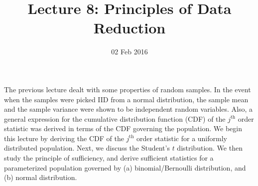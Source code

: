 \documentclass[a4paper,english,12pt]{article}
\title{Lecture 8: Principles of Data Reduction}
\date{02 Feb 2016}
\author{}
\begin{document}
\maketitle
The previous lecture dealt with some properties of random samples. In the event when the samples were picked IID from a normal distribution, the sample mean and the sample variance were shown to be independent random variables. Also, a general expression for the cumulative distribution function (CDF) of the $ j^{\text{th}} $ order statistic was derived in terms of the CDF governing the population. We begin this lecture by deriving the CDF of the $ j^{\text{th}} $ order statistic for a uniformly distributed population. Next, we discuss the Student's $ t $ distribution. We then study the principle of sufficiency, and derive sufficient statistics for a parameterized population governed by (a) binomial/Bernoulli distribution, and (b) normal distribution. 
  
\end{document}
